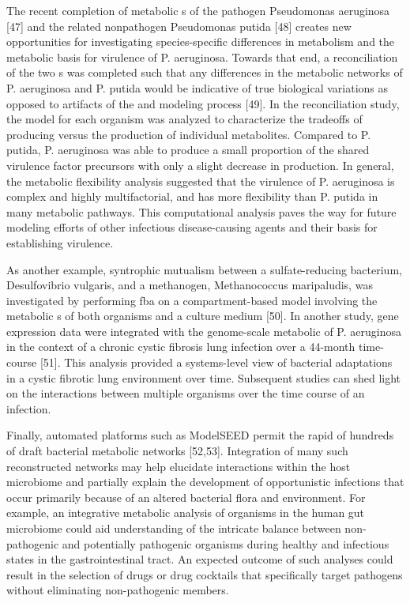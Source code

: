 The recent completion of metabolic s of the 
pathogen Pseudomonas aeruginosa [47] and the related nonpathogen 
Pseudomonas putida [48] creates new opportunities for 
investigating species-specific differences in metabolism 
and the metabolic basis for virulence of P. aeruginosa. 
Towards that end, a reconciliation of the two s 
was completed such that any differences in the metabolic 
networks of P. aeruginosa and P. putida would be indicative 
of true biological variations as opposed to artifacts of 
the  and modeling process [49]. In the reconciliation 
study, the model for each organism was analyzed to characterize 
the tradeoffs of producing  versus the production of 
individual metabolites. Compared to P. putida, P. aeruginosa 
was able to produce a small proportion of the shared virulence 
factor precursors with only a slight decrease in  
production. In general, the metabolic flexibility analysis 
suggested that the virulence of P. aeruginosa is complex 
and highly multifactorial, and has more flexibility than 
P. putida in many metabolic pathways. This computational 
analysis paves the way for future modeling efforts of other 
infectious disease-causing agents and their basis for establishing 
virulence.

As another example, syntrophic mutualism between a sulfate-reducing 
bacterium, Desulfovibrio vulgaris, and a methanogen, Methanococcus 
maripaludis, was investigated by performing \gls{fba} on a compartment-based 
model involving the metabolic s of both organisms 
and a culture medium [50]. In another study, gene expression data 
were integrated with the genome-scale metabolic  of 
P. aeruginosa in the context of a chronic cystic fibrosis lung 
infection over a 44-month time-course [51]. This analysis provided 
a systems-level view of bacterial adaptations in a cystic fibrotic 
lung environment over time. Subsequent studies can shed light on 
the interactions between multiple organisms over the time course 
of an infection.

Finally, automated  platforms such as ModelSEED 
permit the rapid  of hundreds of draft bacterial 
metabolic networks [52,53]. Integration of many such reconstructed 
networks may help elucidate interactions within the host 
microbiome and partially explain the development of opportunistic 
infections that occur primarily because of an altered bacterial 
flora and environment. For example, an integrative metabolic 
analysis of organisms in the human gut microbiome could aid 
understanding of the intricate balance between non-pathogenic 
and potentially pathogenic organisms during healthy and 
infectious states in the gastrointestinal tract. An expected 
outcome of such analyses could result in the selection of 
drugs or drug cocktails that specifically target pathogens 
without eliminating non-pathogenic members.

